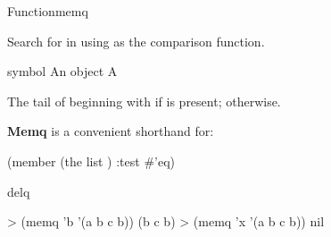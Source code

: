 \documentclass[10pt,twoside,english,pdftex]{article}
\begin{document}

\begin{functiondoc}{Function}{memq}{
    \returns{} } 
%
  
\fnsyntax

\fnpurpose Search for  in  using  as the
comparison function.

\fnpackage {}

\fnmodule {}

\fnargs
\begin{args}{symbol}
\arg[item] An object
\arg[list] A 
\end{args}

\fnreturns The tail of  beginning with  if
 is present; \nil{} otherwise.

\fndescription \textbf{Memq} is a convenient shorthand for:
%
\W\supp
\begin{example}
  (member  (the list ) :test #'eq)
\end{example}

\begin{alsos}{delq}
\also[delq]
\end{alsos}

\fnexamples
%
\W\supp
\begin{example}
> (memq 'b '(a b c b))
(b c b)
> (memq 'x '(a b c b))
nil
\end{example}

\end{functiondoc}

\end{document}
